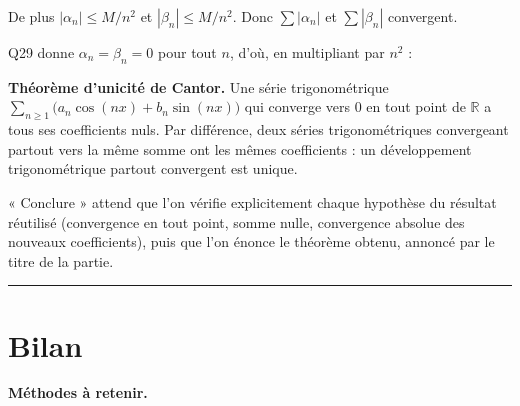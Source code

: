 \documentclass[11pt,a4paper]{article}
\newcommand{\equationajustee}[1]{%
  \sbox{\boiteequation}{$\displaystyle #1$}%
  \ifdim\wd\boiteequation>\linewidth
    \[\resizebox{\linewidth}{!}{\usebox{\boiteequation}}\]%
  \else
    \[#1\]%
  \fi}
\begin{document}
De plus \(|\alpha_n|\leqslant M/n^2\) et \(|\beta_n|\leqslant M/n^2\). Donc \(\sum|\alpha_n|\) et \(\sum|\beta_n|\) convergent.

Q29 donne \(\alpha_n=\beta_n=0\) pour tout \(n\), d'où, en multipliant par \(n^2\) :
\equationajustee{\boxed{\forall n\in\mathbb N^*,\ a_n=0\ \text{et}\ b_n=0}}

\textbf{Théorème d'unicité de Cantor.} Une série trigonométrique \(\sum_{n\geqslant1}\big(a_n\cos(nx)+b_n\sin(nx)\big)\) qui converge vers \(0\) en tout point de \(\mathbb R\) a tous ses coefficients nuls. Par différence, deux séries trigonométriques convergeant partout vers la même somme ont les mêmes coefficients : un développement trigonométrique partout convergent est unique.

\begin{jury}

« Conclure » attend que l'on vérifie explicitement chaque hypothèse du résultat réutilisé (convergence en tout point, somme nulle, convergence absolue des nouveaux coefficients), puis que l'on énonce le théorème obtenu, annoncé par le titre de la partie.

\end{jury}

\begin{center}\rule{0.5\linewidth}{0.5pt}\end{center}

\hypertarget{bilan}{%
\section{Bilan}\label{bilan}}

\textbf{Méthodes à retenir.}
\end{document}
